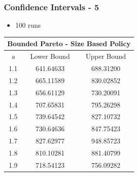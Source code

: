 \documentclass[red]{beamer}
\begin{document}
\begin{frame}
\frametitle{Confidence Intervals - 5}

\vspace{-.2cm}
\begin{itemize}
\item 100 runs
\end{itemize}
\vspace{.3cm}

\hspace*{1cm}
\begin{tabular}{|c|c|c|}
\hline
\multicolumn{3}{|c|}{Bounded Pareto - Size Based Policy} \\
\hline
\textit{a} & Lower Bound & Upper Bound \\
\hline
1.1 & 641.64633	& 688.31200 \\
\hline
1.2 & 665.11589	& 830.02852 \\
\hline
1.3 & 656.61129	& 730.20091 \\
\hline
1.4 & 707.65831	& 795.26298 \\
\hline
1.5 & 739.64542	& 827.10732 \\
\hline
1.6 & 730.64636	& 847.75423 \\
\hline
1.7 & 827.62977	& 948.85723 \\
\hline
1.8 & 810.10281	& 881.40799 \\
\hline
1.9 & 718.54123	& 756.09282 \\
\hline
\end{tabular}
\end{frame}
\end{document}
